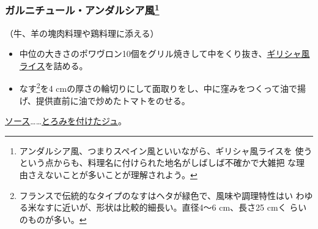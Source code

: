 \begin{recette}
\hypertarget{garniture-andalouse}{%
\subsubsection[ガルニチュール・アンダルシア風]{\texorpdfstring{ガルニチュール・アンダルシア風\footnote{アンダルシア風、つまりスペイン風といいながら、ギリシャ風ライスを
  使うという点からも、料理名に付けられた地名がしばしば不確かで大雑把
  な理由さえないことが多いことが理解されよう。}}{ガルニチュール・アンダルシア風}}\label{garniture-andalouse}}



（牛、羊の塊肉料理や鶏料理に添える）

\begin{itemize}
\item
  中位の大きさのポワヴロン10個をグリル焼きして中をくり抜き、\protect\hyperlink{riz-grecque}{ギリシャ風ライス}を詰める。
\item
  なす\footnote{フランスで伝統的なタイプのなすはヘタが緑色で、風味や調理特性はい
    わゆる米なすに近いが、形状は比較的細長い。直径4〜6 cm、長さ25 cmく
    らいのものが多い。}を4
  cmの厚さの輪切りにして面取りをし、中に窪みをつくって油で揚げ、提供直前に油で炒めたトマトをのせる。
\end{itemize}

\ul{ソース}\ldots{}\ldots{}\protect\hyperlink{jus-de-veau-lie}{とろみを付けたジュ}。

\hypertarget{garniture-arlesienne}{%
}
\end{recette}
